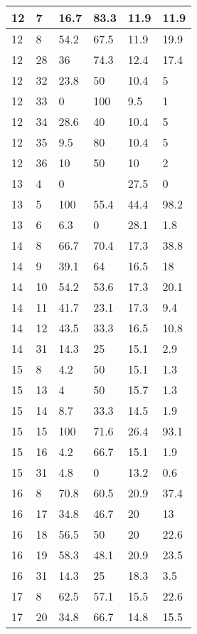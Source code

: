 \begin{longtable}[c]{ | p{2cm} | p{2cm} | p{2cm} | p{2cm} | p{3cm} | p{3cm} | }
	\hline
	12 & 7 & 16.7 & 83.3 & 11.9 & 11.9 \\
	\hline
	12 & 8 & 54.2 & 67.5 & 11.9 & 19.9 \\
	\hline
	12 & 28 & 36 & 74.3 & 12.4 & 17.4 \\
	\hline
	12 & 32 & 23.8 & 50 & 10.4 & 5 \\
	\hline
	12 & 33 & 0 & 100 & 9.5 & 1 \\
	\hline
	12 & 34 & 28.6 & 40 & 10.4 & 5 \\
	\hline
	12 & 35 & 9.5 & 80 & 10.4 & 5 \\
	\hline
	12 & 36 & 10 & 50 & 10 & 2 \\
	\hline
	\hline
	\hline
	13 & 4 & 0 &  & 27.5 & 0 \\
	\hline
	13 & 5 & 100 & 55.4 & 44.4 & 98.2 \\
	\hline
	13 & 6 & 6.3 & 0 & 28.1 & 1.8 \\
	\hline
	\hline
	\hline
	14 & 8 & 66.7 & 70.4 & 17.3 & 38.8 \\
	\hline
	14 & 9 & 39.1 & 64 & 16.5 & 18 \\
	\hline
	14 & 10 & 54.2 & 53.6 & 17.3 & 20.1 \\
	\hline
	14 & 11 & 41.7 & 23.1 & 17.3 & 9.4 \\
	\hline
	14 & 12 & 43.5 & 33.3 & 16.5 & 10.8 \\
	\hline
	14 & 31 & 14.3 & 25 & 15.1 & 2.9 \\
	\hline
	\hline
	\hline
	15 & 8 & 4.2 & 50 & 15.1 & 1.3 \\
	\hline
	15 & 13 & 4 & 50 & 15.7 & 1.3 \\
	\hline
	15 & 14 & 8.7 & 33.3 & 14.5 & 1.9 \\
	\hline
	15 & 15 & 100 & 71.6 & 26.4 & 93.1 \\
	\hline
	15 & 16 & 4.2 & 66.7 & 15.1 & 1.9 \\
	\hline
	15 & 31 & 4.8 & 0 & 13.2 & 0.6 \\
	\hline
	\hline
	\hline
	16 & 8 & 70.8 & 60.5 & 20.9 & 37.4 \\
	\hline
	16 & 17 & 34.8 & 46.7 & 20 & 13 \\
	\hline
	16 & 18 & 56.5 & 50 & 20 & 22.6 \\
	\hline
	16 & 19 & 58.3 & 48.1 & 20.9 & 23.5 \\
	\hline
	16 & 31 & 14.3 & 25 & 18.3 & 3.5 \\
	\hline
	\hline
	\hline
	17 & 8 & 62.5 & 57.1 & 15.5 & 22.6 \\
	\hline
	17 & 20 & 34.8 & 66.7 & 14.8 & 15.5 \\

\end{longtable}

